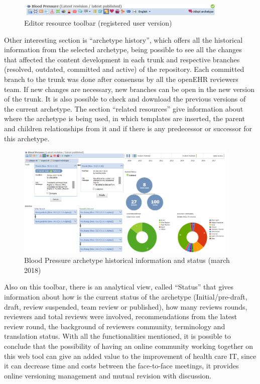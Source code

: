 \documentclass[mim_thesis.tex]{subfiles}
\begin{document}
\begin{figure}[H]
	\centering
    \includegraphics[width=0.9\textwidth]{img/editor_resource_toolbar.PNG}
	\caption{Editor resource toolbar (registered user version) }
	\label{fig:editor_resource_toolbar}
\end{figure}

Other interesting section is “archetype history”, which offers all the historical information from the selected archetype, being possible to see all the changes that affected the content development in each trunk and respective branches (resolved, outdated, committed and active) of the repository. Each committed branch to the trunk was done after consensus by all the openEHR reviewers team. If new changes are necessary, new branches can be open in the new version of the trunk. It is also possible to check and download the previous versions of the current archetype. The section “related resources” give information about where the archetype is being used, in which templates are inserted, the parent and children relationships from it and if there is any predecessor or successor for this archetype.  

\begin{figure}[H]
	\centering
    \includegraphics[width=0.95\textwidth]{img/bp_history.PNG}
	\caption{ Blood Pressure archetype historical information and status (march 2018)}
	\label{fig:bp_history}
\end{figure}

Also on this toolbar, there is an analytical view, called “Status” that gives information about how is the current status of the archetype (Initial/pre-draft, draft, review suspended, team review or published), how many reviews rounds, reviewers and total reviews were involved, recommendations from the latest review round, the background of reviewers community, terminology and translation status. With all the functionalities mentioned, it is possible to conclude that the possibility of having an online community working together on this web tool can give an added value to the improvement of health care IT, since it can decrease time and costs between the face-to-face meetings, it provides online versioning management and mutual revision with discussion.
\end{document}
